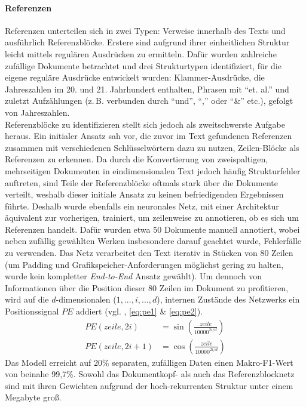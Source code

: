 \documentclass[bachelor,german]{info1thesis}
\begin{document}
\paragraph{Referenzen} Referenzen unterteilen sich in zwei Typen: Verweise innerhalb des Texts und ausführlich Referenzblöcke. Erstere sind aufgrund ihrer einheitlichen Struktur leicht mittels regulären Ausdrücken zu ermitteln. Dafür wurden zahlreiche zufällige Dokumente betrachtet und drei Strukturtypen identifiziert, für die eigene reguläre Ausdrücke entwickelt wurden: Klammer-Ausdrücke, die Jahreszahlen im 20. und 21. Jahrhundert enthalten, Phrasen mit ``et. al.'' und zuletzt Aufzählungen (z.\,B. verbunden durch ``und'', ``,'' oder ``\&'' etc.), gefolgt von Jahreszahlen. \\
Referenzblöcke zu identifizieren stellt sich jedoch als zweitschwerste Aufgabe heraus. Ein initialer Ansatz sah vor, die zuvor im Text gefundenen Referenzen zusammen mit verschiedenen Schlüsselwörtern dazu zu nutzen, Zeilen-Blöcke als Referenzen zu erkennen. Da durch die Konvertierung von zweispaltigen, mehrseitigen Dokumenten in eindimensionalen Text jedoch häufig Strukturfehler auftreten, sind Teile der Referenzblöcke oftmals stark über die Dokumente verteilt, weshalb dieser initiale Ansatz zu keinen befriedigenden Ergebnissen führte. Deshalb wurde ebenfalls ein neuronales Netz, mit einer Architektur äquivalent zur vorherigen, trainiert, um zeilenweise zu annotieren, ob es sich um Referenzen handelt. Dafür wurden etwa 50 Dokumente manuell annotiert, wobei neben zufällig gewählten Werken insbesondere darauf geachtet wurde, Fehlerfälle zu verwenden. Das Netz verarbeitet den Text iterativ in Stücken von 80 Zeilen (um Padding und Grafikspeicher-Anforderungen möglichst gering zu halten, wurde kein kompletter \textit{End-to-End} Ansatz gewählt). Um dennoch von Informationen über die Position dieser 80 Zeilen im Dokument zu profitieren, wird auf die $d$-dimensionalen ($1, ..., i, ..., d$), internen Zustände des Netzwerks ein Positionssignal $PE$ addiert (vgl. \cite{Vaswani2017}, \autoref{eq:pe1} \& \ref{eq:pe2}).
\begin{align}
PE(zeile, 2i) &= \sin\left(\frac{zeile}{10000^{2i / d}}\right) \label{eq:pe1} \\ \label{eq:pe2}
PE(zeile, 2i+1) &= \cos\left(\frac{zeile}{10000^{2i / d}}\right)
\end{align}
Das Modell erreicht auf 20\% separaten, zufälligen Daten einen Makro-F1-Wert von beinahe 99,7\%.
Sowohl das Dokumentkopf- als auch das Referenzblocknetz sind mit ihren Gewichten aufgrund der hoch-rekurrenten Struktur unter einem Megabyte groß.
\end{document}
